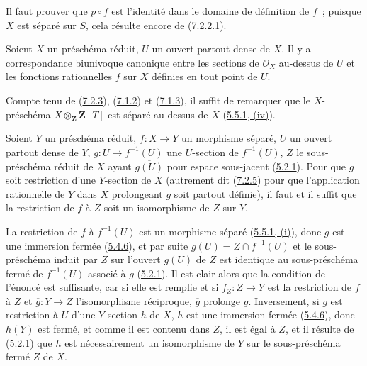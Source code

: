 Il faut prouver que $p\circ\overline f$ est l'identité dans le domaine de
définition de $\overline f$~; puisque $X$ est séparé sur $S$, cela résulte
encore de (\hyperref[I.7.2.2.1-fr]{7.2.2.1}).

\begin{corollary}[7.2.6]
\label{I.7.2.6-fr}
Soient $X$ un préschéma réduit, $U$ un ouvert partout dense de $X$. Il y a
correspondance biunivoque canonique entre les sections de $\mathscr{O}_X$ au-dessus
de $U$ et les fonctions rationnelles $f$ sur $X$ définies en tout point de $U$.
\end{corollary}

Compte tenu de (\hyperref[I.7.2.3-fr]{7.2.3}),
(\hyperref[I.7.1.2-fr]{7.1.2}) et (\hyperref[I.7.1.3-fr]{7.1.3}), il suffit de
remarquer que le $X$-préschéma $X\otimes_{\mathbf Z}\mathbf Z[T]$ est séparé
au-dessus de $X$ (\hyperref[I.5.5.1-fr]{5.5.1, (iv)}).

\begin{corollary}[7.2.7]
\label{I.7.2.7-fr}
Soient $Y$ un préschéma réduit, $f:X\to Y$ un morphisme séparé, $U$ un ouvert
partout dense de $Y$, $g:U\to f^{-1}(U)$ une $U$-section de $f^{-1}(U)$, $Z$
le sous-préschéma réduit de $X$ ayant $\overline{g(U)}$ pour espace sous-jacent
\textup{(\hyperref[I.5.2.1-fr]{5.2.1})}. Pour que $g$ soit restriction d'une
$Y$-section de $X$ \textup{(autrement dit (\hyperref[I.7.2.5-fr]{7.2.5}) pour que
l'application rationnelle de $Y$ dans $X$ prolongeant $g$ soit partout
définie)}, il faut et il suffit que la restriction de $f$ à $Z$ soit un
isomorphisme de $Z$ sur $Y$.
\end{corollary}

La restriction de $f$ à $f^{-1}(U)$ est un morphisme séparé
(\hyperref[I.5.5.1-fr]{5.5.1, (i)}), donc $g$ est une immersion fermée
(\hyperref[I.5.4.6-fr]{5.4.6}), et par suite
$g(U)=Z\cap f^{-1}(U)$ et le sous-préschéma induit par $Z$ sur l'ouvert
$g(U)$ de $Z$ est identique au sous-préschéma fermé de $f^{-1}(U)$ associé à
$g$ (\hyperref[I.5.2.1-fr]{5.2.1}). Il est clair alors que la condition de
l'énoncé est suffisante, car si elle est remplie et si $f_Z:Z\to Y$ est la
restriction de $f$ à $Z$ et $\overline g:Y\to Z$ l'isomorphisme réciproque,
$\overline g$ prolonge $g$. Inversement, si $g$ est restriction à $U$ d'une
$Y$-section $h$ de $X$, $h$ est une immersion fermée
(\hyperref[I.5.4.6-fr]{5.4.6}), donc $h(Y)$ est fermé, et comme il est contenu
dans $Z$, il est égal à $Z$, et il résulte de
(\hyperref[I.5.2.1-fr]{5.2.1}) que $h$ est nécessairement un isomorphisme de
$Y$ sur le sous-préschéma fermé $Z$ de $X$.

